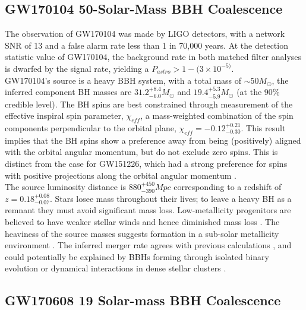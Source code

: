 \documentclass[binding=0.6cm, LaM]{sapthesis}
\begin{document}
\subsection{GW170104 50-Solar-Mass BBH Coalescence}

	The observation of GW170104 was made by LIGO detectors, 
	with a network SNR of 13 and a false alarm rate less than 1 in 70,000 years.
	At the detection statistic value of GW170104, the background rate in both matched filter 
	analyses is dwarfed by the signal rate, yielding a $P_{astro} > 1 - (3 \times 10^{-5)}$. \\
	GW170104’s source is a heavy BBH system, with a total mass of $\sim50M_\odot$,	
	the inferred component BH masses are $31.2^{+8.4}_{-6.0}M_\odot$ and $19.4^{+5.3} _{-5.9}M_\odot$ (at the 90\% credible level). 
	The BH spins are best constrained through measurement of the effective inspiral spin parameter, $\chi_{eff}$, 
	a mass-weighted combination of the spin components perpendicular to the orbital plane, $\chi_{eff} = −0.12^{+0.21}_{−0.30}$. 
	This result implies that the BH spins show a preference away from being 
	(positively) aligned with the orbital angular momentum, but do not exclude zero spins. 
	This is distinct from the case for GW151226, which had a strong preference 
	for spins with positive projections along the orbital angular momentum \cite{58}. \\
	The source luminosity distance is $880^{+450}_{−390} Mpc$ corresponding to a redshift of $z = 0.18^{+0.08}_{−0.07}$. 
	Stars losee mass throughout their lives; to leave a heavy BH as a remnant 
	they must avoid significant mass loss. 
	Low-metallicity progenitors are believed to have weaker stellar winds and hence diminished mass loss \cite{135}. 
	The heaviness of the source masses suggests formation in a sub-solar metallicity environment \cite{134}. 
	The inferred merger rate agrees with previous calculations \cite{59, 137}, and could potentially be explained 	
	by BBHs forming through isolated binary evolution or dynamical interactions in dense stellar clusters \cite{134}. 

\subsection{GW170608 19 Solar-mass BBH Coalescence}
\end{document}
